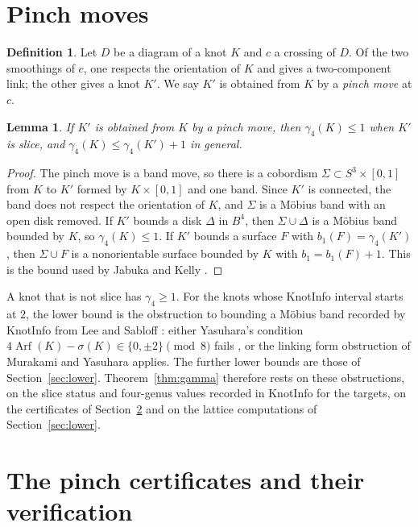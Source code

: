 \documentclass[11pt]{amsart}
\newtheorem{lemma}[theorem]{Lemma}
\theoremstyle{definition}
\newtheorem{definition}[theorem]{Definition}
\theoremstyle{remark}
\numberwithin{equation}{section}
\begin{document}
\section{Pinch moves}\label{sec:pinch}

\begin{definition}
Let $D$ be a diagram of a knot $K$ and $c$ a crossing of $D$. Of the two smoothings of $c$,
one respects the orientation of $K$ and gives a two-component link; the other gives a knot
$K'$. We say $K'$ is obtained from $K$ by a \emph{pinch move} at $c$.
\end{definition}

\begin{lemma}\label{lem:pinch}
If $K'$ is obtained from $K$ by a pinch move, then $\gamma_4(K)\le 1$ when $K'$ is slice,
and $\gamma_4(K)\le\gamma_4(K')+1$ in general.
\end{lemma}

\begin{proof}
The pinch move is a band move, so there is a cobordism $\Sigma\subset S^3\times[0,1]$ from
$K$ to $K'$ formed by $K\times[0,1]$ and one band. Since $K'$ is connected, the band does
not respect the orientation of $K$, and $\Sigma$ is a M\"obius band with an open disk
removed. If $K'$ bounds a disk $\Delta$ in $B^4$, then $\Sigma\cup\Delta$ is a M\"obius band
bounded by $K$, so $\gamma_4(K)\le1$. If $K'$ bounds a surface $F$ with
$b_1(F)=\gamma_4(K')$, then $\Sigma\cup F$ is a nonorientable surface bounded by $K$ with
$b_1=b_1(F)+1$. This is the bound used by Jabuka and Kelly \cite{JK}.
\end{proof}

A knot that is not slice has $\gamma_4\ge1$. For the knots whose KnotInfo interval starts
at $2$, the lower bound is the obstruction to bounding a M\"obius band recorded by KnotInfo
from Lee and Sabloff \cite{LS}: either Yasuhara's condition
$4\operatorname{Arf}(K)-\sigma(K)\in\{0,\pm2\}\pmod 8$ fails \cite{Ya}, or the linking form
obstruction of Murakami and Yasuhara \cite{MY} applies. The further lower bounds are those
of Section~\ref{sec:lower}. Theorem~\ref{thm:gamma} therefore rests on these obstructions,
on the slice status and four-genus values recorded in KnotInfo for the targets, on the
certificates of Section~\ref{sec:gcert} and on the lattice computations of
Section~\ref{sec:lower}.

\section{The pinch certificates and their verification}\label{sec:gcert}
\end{document}

